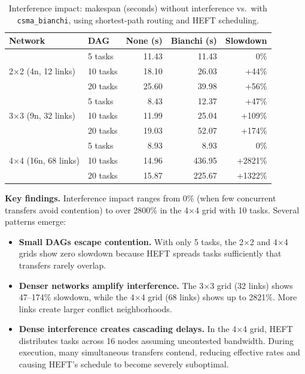 \documentclass[conference]{IEEEtran}
\begin{document}
\begin{table}[t]
\centering
\caption{Interference impact: makespan (seconds) without interference vs.\
with \texttt{csma\_bianchi}, using shortest-path routing and HEFT scheduling.}
\label{tab:interference}
\begin{tabular}{@{}llrrr@{}}
\toprule
\textbf{Network} & \textbf{DAG} & \textbf{None (s)} & \textbf{Bianchi (s)} & \textbf{Slowdown} \\
\midrule
\multirow{3}{*}{2$\times$2 (4n, 12 links)}
  & 5 tasks   & 11.43  & 11.43  & 0\%     \\
  & 10 tasks  & 18.10  & 26.03  & +44\%   \\
  & 20 tasks  & 25.60  & 39.98  & +56\%   \\
\midrule
\multirow{3}{*}{3$\times$3 (9n, 32 links)}
  & 5 tasks   & 8.43   & 12.37  & +47\%   \\
  & 10 tasks  & 11.99  & 25.04  & +109\%  \\
  & 20 tasks  & 19.03  & 52.07  & +174\%  \\
\midrule
\multirow{3}{*}{4$\times$4 (16n, 68 links)}
  & 5 tasks   & 8.93   & 8.93   & 0\%     \\
  & 10 tasks  & 14.96  & 436.95 & +2821\% \\
  & 20 tasks  & 15.87  & 225.67 & +1322\% \\
\bottomrule
\end{tabular}
\end{table}

\textbf{Key findings.}
Interference impact ranges from 0\% (when few concurrent transfers avoid
contention) to over 2800\% in the 4$\times$4 grid with 10 tasks.  Several
patterns emerge:

\begin{itemize}[itemsep=1pt,leftmargin=*]
\item \textbf{Small DAGs escape contention.}  With only 5 tasks, the
  2$\times$2 and 4$\times$4 grids show zero slowdown because HEFT spreads
  tasks sufficiently that transfers rarely overlap.
\item \textbf{Denser networks amplify interference.}  The 3$\times$3 grid
  (32 links) shows 47--174\% slowdown, while the 4$\times$4 grid (68 links)
  shows up to 2821\%.  More links create larger conflict neighborhoods.
\item \textbf{Dense interference creates cascading delays.}  In the
  4$\times$4 grid, HEFT distributes tasks across 16 nodes assuming
  uncontested bandwidth.  During execution, many simultaneous transfers
  contend, reducing effective rates and causing HEFT's schedule to
  become severely suboptimal.
\end{itemize}
\end{document}
